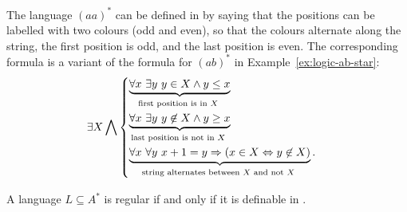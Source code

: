 \begin{myexample}\label{ex:logic-parity}
    The language $(aa)^*$ can be defined in \mso by saying that the positions can be labelled with two colours (odd and even), so that the colours alternate along the string, the first position is odd, and the last position is even. The corresponding formula  is a variant of the formula for $(ab)^*$ in Example~\ref{ex:logic-ab-star}:
\begin{align*}
    \exists X 
\bigwedge
\begin{cases}
    \myunderbrace{\forall x \ \exists y \ y \in X \land y \leq x}{first position is in $X$} \\ 
    \myunderbrace{\forall x \ \exists y \ y \not \in X \land y \geq x}{last position is not in $X$} \\
    \myunderbrace{\forall x \ \forall y \ x + 1 = y \Rightarrow (x \in X \Leftrightarrow y \not \in X)}{string alternates between $X$ and not $X$}.
\end{cases}
\end{align*}
\end{myexample}

\begin{theorem}
    \label{thm:mso-logic-languages}
    A language $L \subseteq A^*$ is regular if and only if it is definable in \mso.
\end{theorem}

